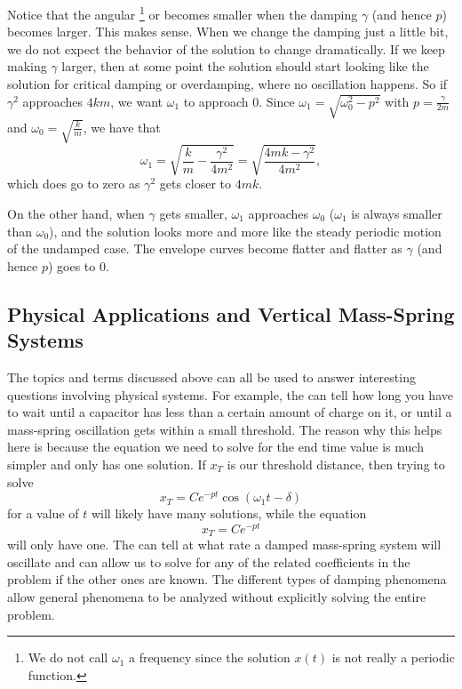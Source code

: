 Notice that the angular
\emph{}\footnote{We do not call $\omega_1$ a frequency
since the solution $x(t)$ is not really a periodic function.} or \emph{} becomes
smaller when the damping $\gamma$ (and hence $p$) becomes larger.  This makes sense.
When we change the damping just a little bit, we do not
expect the behavior of the solution to change dramatically.
If we keep making $\gamma$ larger, then
at some point the solution should start looking 
like the solution for critical damping or overdamping, where no oscillation
happens.  So if $\gamma^2$ approaches $4km$, we want $\omega_1$ to approach 0. Since $\omega_1 = \sqrt{\omega_0^2 - p^2}$ with $p = \frac{\gamma}{2m}$ and $\omega_0 = \sqrt{\frac{k}{m}}$, we have that
\begin{equation*}
\omega_1 = \sqrt{\frac{k}{m} - \frac{\gamma^2}{4m^2}} = \sqrt{\frac{4mk - \gamma^2}{4m^2}},
\end{equation*}
which does go to zero as $\gamma^2$ gets closer to $4mk$. 


On the other hand, when $\gamma$ gets smaller, $\omega_1$ approaches $\omega_0$
($\omega_1$ is always smaller than $\omega_0$), and the solution looks more and more like the steady
periodic motion of the undamped case.  The envelope curves become flatter and
flatter as $\gamma$ (and hence $p$) goes to 0.

\subsection{Physical Applications and Vertical Mass-Spring Systems}

The topics and terms discussed above can all be used to answer interesting questions involving physical systems. For example, the \emph{} can tell how long you have to wait until a capacitor has less than a certain amount of charge on it, or until a mass-spring oscillation gets within a small threshold. The reason why this helps here is because the equation we need to solve for the end time value is much simpler and only has one solution. If $x_T$ is our threshold distance, then trying to solve 
\begin{equation*}
x_T = C e^{-pt} \cos ( \omega_1 t - \delta )
\end{equation*}
for a value of $t$ will likely have many solutions, while the equation 
\begin{equation*}
x_T = C e^{-pt} 
\end{equation*}
will only have one. The \emph{} can tell at what rate a damped mass-spring system will oscillate and can allow us to solve for any of the related coefficients in the problem if the other ones are known. The different types of damping phenomena allow general phenomena to be analyzed without explicitly solving the entire problem.

